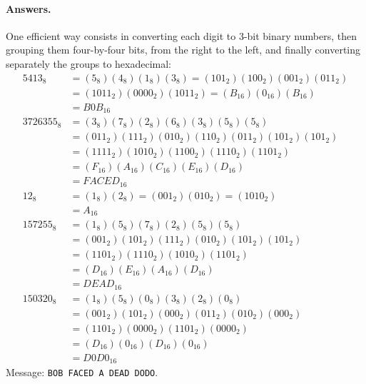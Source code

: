 \paragraph{Answers.} One efficient way consists in converting each
digit to 3\hyp{}bit binary numbers, then grouping them
four\hyp{}by\hyp{}four bits, from the right to the left, and finally
converting separately the groups to hexadecimal:
\begin{align*}
5413_8    &= (5_8)(4_8)(1_8)(3_8) = (101_2)(100_2)(001_2)(011_2)\\
          &= (1011_2)(0000_2)(1011_2) = (B_{16})(0_{16})(B_{16})\\
          &= \textit{B0B}_{16}\\
3726355_8 &= (3_8)(7_8)(2_8)(6_8)(3_8)(5_8)(5_8)\\
          &= (011_2)(111_2)(010_2)(110_2)(011_2)(101_2)(101_2)\\
          &= (1111_2)(1010_2)(1100_2)(1110_2)(1101_2)\\
          &= (F_{16})(A_{16})(C_{16})(E_{16})(D_{16})\\
          &= \textit{FACED}_{16}\\
12_8      &= (1_8)(2_8) = (001_2)(010_2) = (1010_2)\\
          &= A_{16}\\
157255_8  &= (1_8)(5_8)(7_8)(2_8)(5_8)(5_8)\\
          &= (001_2)(101_2)(111_2)(010_2)(101_2)(101_2)\\
          &= (1101_2)(1110_2)(1010_2)(1101_2)\\
          &= (D_{16})(E_{16})(A_{16})(D_{16})\\
          &= \textit{DEAD}_{16}\\
150320_8  &= (1_8)(5_8)(0_8)(3_8)(2_8)(0_8)\\
          &= (001_2)(101_2)(000_2)(011_2)(010_2)(000_2)\\
          &= (1101_2)(0000_2)(1101_2)(0000_2)\\
          &= (D_{16})(0_{16})(D_{16})(0_{16})\\
          &= \textit{D0D0}_{16}
\end{align*}
Message: \texttt{BOB FACED A DEAD DODO}.
